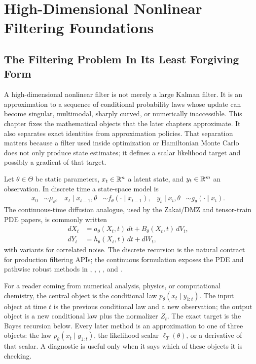 \chapter[High-Dimensional Filtering Foundations]{High-Dimensional Nonlinear Filtering Foundations}
\label{ch:bf-highdim-nonlinear-foundations}

\section{The Filtering Problem In Its Least Forgiving Form}
\label{sec:bf-highdim-foundations-problem}

A high-dimensional nonlinear filter is not merely a large Kalman filter.  It is
an approximation to a sequence of conditional probability laws whose update
can become singular, multimodal, sharply curved, or numerically inaccessible.
This chapter fixes the mathematical objects that the later chapters approximate.
It also separates exact identities from approximation policies.  That separation
matters because a filter used inside optimization or Hamiltonian Monte Carlo
does not only produce state estimates; it defines a scalar likelihood target and
possibly a gradient of that target.

Let $\theta\in\Theta$ be static parameters, $x_t\in\mathbb{R}^n$ a latent state, and
$y_t\in\mathbb{R}^m$ an observation.  In discrete time a state-space model is
\begin{align}
  x_0 &\sim \mu_\theta, &
  x_t\mid x_{t-1},\theta &\sim f_\theta(\cdot\mid x_{t-1}), &
  y_t\mid x_t,\theta &\sim g_\theta(\cdot\mid x_t).
  \label{eq:bf-hd-ssm}
\end{align}
The continuous-time diffusion analogue, used by the Zakai/DMZ and tensor-train
PDE papers, is commonly written
\begin{align}
  dX_t &= a_\theta(X_t,t)\,dt + B_\theta(X_t,t)\,dV_t, \\
  dY_t &= h_\theta(X_t,t)\,dt + dW_t,
  \label{eq:bf-hd-continuous-ssm}
\end{align}
with variants for correlated noise.  The discrete recursion is the natural
contract for production filtering APIs; the continuous formulation exposes the
PDE and pathwise robust methods in \citet{davis1980multiplicative},
\citet{yau2000realtime}, \citet{yau2008realtime},
\citet{li2019ttfiltering}, and \citet{meng2025regularity}.

For a reader coming from numerical analysis, physics, or computational
chemistry, the central object is the conditional law
\(p_\theta(x_t\mid y_{1:t})\).  The input object at time \(t\) is the previous
conditional law and a new observation; the output object is a new conditional
law plus the normalizer \(Z_t\).  The exact target is the Bayes recursion below.
Every later method is an approximation to one of three objects: the law
\(p_\theta(x_t\mid y_{1:t})\), the likelihood scalar
\(\ell_T(\theta)\), or a derivative of that scalar.  A diagnostic is useful only
when it says which of these objects it is checking.

